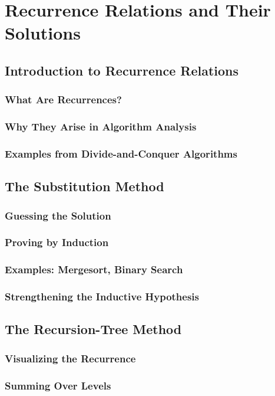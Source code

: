 
\chapter{Recurrence Relations and Their Solutions}
\section{Introduction to Recurrence Relations}
\subsection{What Are Recurrences?}
\subsection{Why They Arise in Algorithm Analysis}
\subsection{Examples from Divide-and-Conquer Algorithms}

\section{The Substitution Method}
\subsection{Guessing the Solution}
\subsection{Proving by Induction}
\subsection{Examples: Mergesort, Binary Search}
\subsection{Strengthening the Inductive Hypothesis}

\section{The Recursion-Tree Method}
\subsection{Visualizing the Recurrence}
\subsection{Summing Over Levels}
